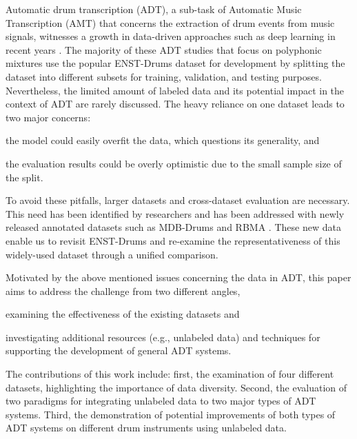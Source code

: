 \documentclass{article}
\begin{document}
Automatic drum transcription (ADT), a sub-task of Automatic Music Transcription (AMT) \cite{Benetos2013} that concerns the extraction of drum events from music signals, witnesses a growth in data-driven approaches such as deep learning in recent years \cite{Vogl2016, Southall2016, Vogl2017_icassp, Southall2017, Vogl2017_ismir}. The majority of these ADT studies that focus on polyphonic mixtures use the popular ENST-Drums dataset \cite{Gillet2006_enst} for development by splitting the dataset into different subsets for training, validation, and testing purposes. Nevertheless, the limited amount of labeled data and its potential impact in the context of ADT are rarely discussed. 
The heavy reliance on one dataset leads to two major concerns: 
\begin{inparaenum}[(i)]
	\item   the model could easily overfit the data, which questions its generality, and
    \item   the evaluation results could be overly optimistic due to the small sample size of the split. 
\end{inparaenum} 
To avoid these pitfalls, larger datasets and cross-dataset evaluation are necessary. This need has been identified by researchers and has been addressed with newly released annotated datasets such as MDB-Drums \cite{Southall2017_mdb} and RBMA \cite{Vogl2017_ismir}. These new data enable us to revisit ENST-Drums and re-examine the representativeness of this widely-used dataset through a unified comparison. 

Motivated by the above mentioned issues concerning the data in ADT, this paper aims to address the challenge from two different angles,
\begin{inparaenum}[(i)]
	\item examining the effectiveness of the existing datasets and
	\item investigating additional resources (e.g., unlabeled data) and techniques for supporting the development of general ADT systems.
\end{inparaenum} 
The contributions of this work include: first, the examination of four different datasets, highlighting the importance of data diversity. Second, the evaluation of two paradigms for integrating unlabeled data to two major types of ADT systems. Third, the demonstration of potential improvements of both types of ADT systems on different drum instruments using unlabeled data.
\end{document}

